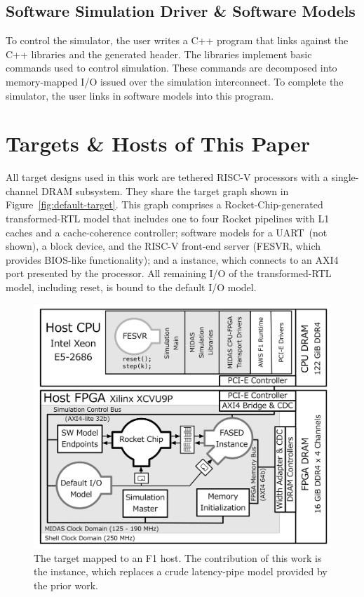 \subsection{Software Simulation Driver \& Software Models}
To control the simulator, the user writes a C++ program that links against the
\SIMNAME C++ libraries and the generated header. The \SIMNAME libraries implement
basic commands used to control simulation.  These commands are decomposed into
memory-mapped I/O issued over the simulation interconnect.  To complete
the simulator, the user links in software models into this program.

\section{Targets \& Hosts of This Paper}\label{sec:targetandhostmachines}

All target designs used in this work are tethered RISC-V processors with a
single-channel DRAM subsystem.  They share the target graph shown in
Figure~\ref{fig:default-target}. This graph comprises a Rocket-Chip-generated
transformed-RTL model that includes one to four Rocket pipelines with L1 caches
and a cache-coherence controller; software models for a UART~(not shown),
a block device, and the RISC-V front-end server
(FESVR, which provides BIOS-like functionality); and a \PNAME instance,
which connects to an AXI4 port presented by the processor.  All remaining I/O
of the transformed-RTL model, including reset, is bound to the default I/O
model.

\begin{figure}[t]
    \centering
    \includegraphics[width=\columnwidth]{figures/mapped-simulator.pdf}
    \caption{The target mapped to an F1 host. The contribution of this work is
    the \PNAME instance, which replaces a crude latency-pipe model provided
    by the prior work.}
    \label{fig:mapped-simulator}
\end{figure}

